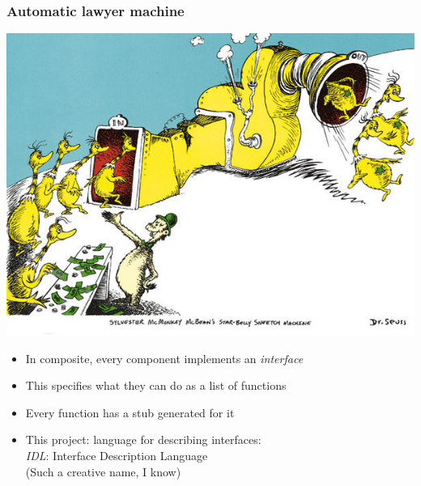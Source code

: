 \documentclass[bigger]{beamer}
\begin{document}
\begin{frame}
\frametitle{Automatic lawyer machine}
\label{sec-8}

\includegraphics[scale=0.75]{../pictures/star-bellied.jpg}
\begin{itemize}
\item In composite, every component implements an \emph{interface}
\item This specifies what they can do as a list of functions
\item Every function has a stub generated for it
\item This project: language for describing interfaces:\\ \emph{IDL}:  Interface Description Language \\ (Such a creative name, I know)
\end{itemize}
\end{frame}
\end{document}
